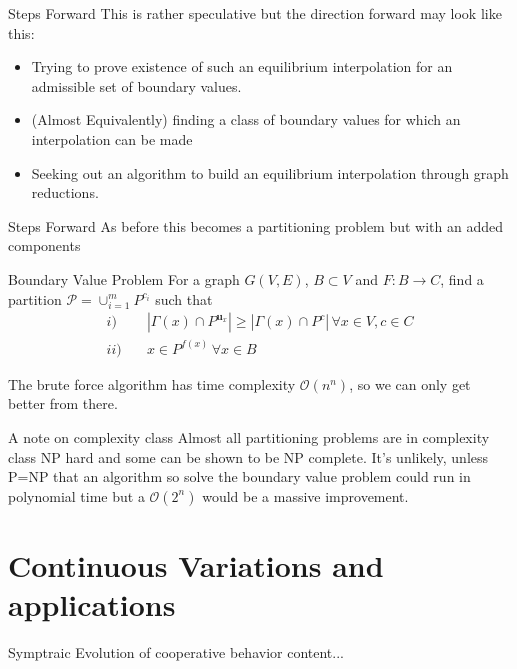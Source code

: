 \documentclass{beamer}
\DeclareMathOperator{\uu}{\mathbf{u}}
\begin{document}
\begin{frame}{Steps Forward}
	This is rather speculative but the direction forward may look like this:
	\begin{itemize}
		\item Trying to prove existence of such an equilibrium interpolation for an admissible set of boundary values. 
		\item (Almost Equivalently) finding a class of boundary values for which an interpolation can be made
		\item Seeking out an algorithm to build an equilibrium interpolation through graph reductions.  
	\end{itemize}
\end{frame}
\begin{frame}{Steps Forward}
	As before this becomes a partitioning problem but with an added components
	\begin{block}{Boundary Value Problem }
		For a graph $G(V,E)$, $B\subset V$ and $F:B\rightarrow C$, find a partition $\mathcal{P}=\cup_{i=1}^mP^{c_i}$ such that 
		\begin{equation}
			\begin{split}
				i)\quad & |\Gamma(x)\cap P^{\uu_x}|\geq |\Gamma(x)\cap P^{c}|\,\forall x\in V, c\in C \\
				ii)\quad &  x\in P^{f(x)}\,\forall x\in B 
			\end{split}
		\end{equation}
	\end{block}
	The brute force algorithm has time complexity $\mathcal{O}(n^n)$, so we can only get better from there. 
\end{frame}
\begin{frame}
	{A note on complexity class}
	Almost all partitioning problems are in complexity class NP hard and some can be shown to be NP complete. It's unlikely, unless P=NP that an algorithm so solve the boundary value problem could run in polynomial time  but a $\mathcal{O}(2^n)$ would be a massive improvement.
\end{frame}
\section{Continuous Variations and applications}
\begin{frame}{Symptraic Evolution of cooperative behavior}
	content...
\end{frame}
\end{document}
